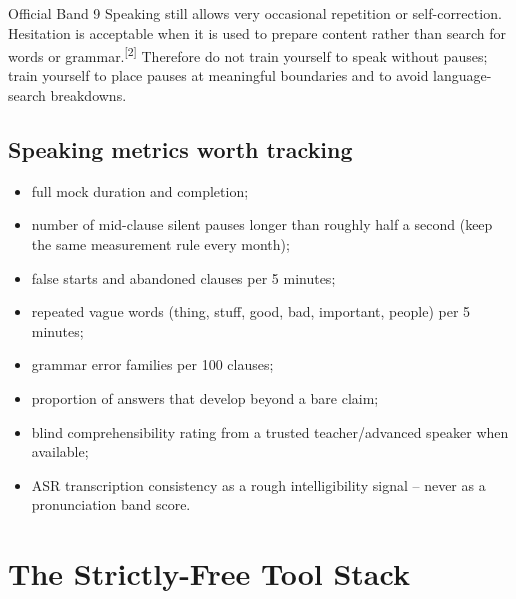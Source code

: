\documentclass[11pt,a4paper]{article}
\newcommand{\src}[1]{\textsuperscript{[#1]}}
\begin{document}
\begin{keybox}
Official Band 9 Speaking still allows very occasional repetition or self-correction. Hesitation is acceptable when it is used to prepare content rather than search for words or grammar.\src{2} Therefore do not train yourself to speak without pauses; train yourself to place pauses at meaningful boundaries and to avoid language-search breakdowns.
\end{keybox}

\subsection{Speaking metrics worth tracking}
\begin{itemize}
\item full mock duration and completion;
\item number of mid-clause silent pauses longer than roughly half a second (keep the same measurement rule every month);
\item false starts and abandoned clauses per 5 minutes;
\item repeated vague words (thing, stuff, good, bad, important, people) per 5 minutes;
\item grammar error families per 100 clauses;
\item proportion of answers that develop beyond a bare claim;
\item blind comprehensibility rating from a trusted teacher/advanced speaker when available;
\item ASR transcription consistency as a rough intelligibility signal -- never as a pronunciation band score.
\end{itemize}

\section{The Strictly-Free Tool Stack}
\end{document}
